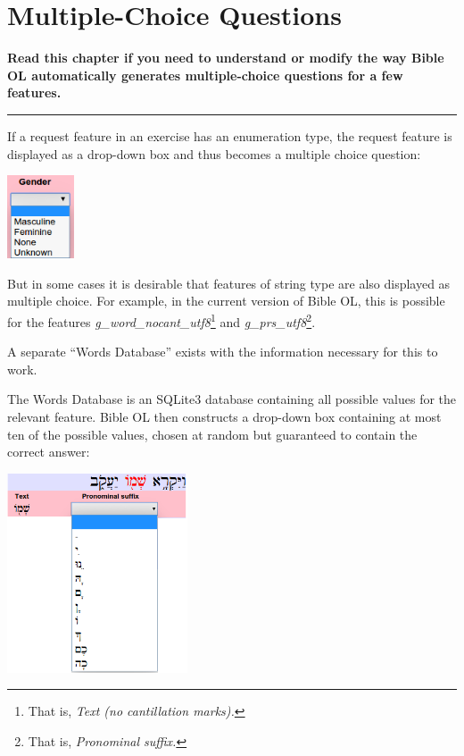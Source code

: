 \documentclass[11pt,oneside,a4paper]{memoir}
\begin{document}
\chapter{Multiple-Choice Questions}\label{chap-multiple-choice}

\textbf{Read this chapter if you need to understand or modify the way Bible OL automatically
  generates multiple-choice questions for a few features.}
\plainbreak{3}


If a request feature in an exercise has an
enumeration type, the request feature is displayed as a drop-down box and
thus becomes a multiple choice question:

\begin{center}
  \includegraphics[width=0.148\textwidth]{gender.png}
\end{center}

But in some cases it is desirable that features of string type are also displayed as multiple
choice. For example, in the current version of Bible OL, this is possible for the features
\emph{g\_word\_nocant\_utf8}\footnote{That is, \emph{Text (no cantillation marks).}} and
\emph{g\_prs\_utf8}\footnote{That is, \emph{Pronominal suffix.}}.

A separate ``Words Database'' exists with the information necessary for this to work.

The Words Database is an SQLite3 database containing all possible values for the relevant feature.
Bible OL then constructs a drop-down box containing at most ten of the possible values, chosen at
random but guaranteed to contain the correct answer:

\begin{center}
  \includegraphics[width=0.4\textwidth]{pronsuf.png}
\end{center}
\end{document}

